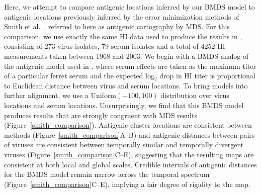 \documentclass[11pt,oneside,letterpaper]{article}
\begin{document}
Here, we attempt to compare antigenic locations inferred by our BMDS model to antigenic locations previously inferred by the error minimization methods of Smith et al.\ \cite{Smith04}, referred to here as antigenic cartography by MDS.
For this comparison, we use exactly the same HI data used to produce the results in \cite{Smith04}, consisting of 273 virus isolates, 79 serum isolates and a total of 4252 HI measurements taken between 1968 and 2003.
We begin with a BMDS analog of the antigenic model used in \cite{Smith04}, where serum effects are taken as the maximum titer of a particular ferret serum and the expected log$_2$ drop in HI titer is proportional to Euclidean distance between virus and serum locations.
To bring models into further alignment, we use a Uniform$(-100,100)$ distribution over virus locations and serum locations.
Unsurprisingly, we find that this BMDS model produces results that are strongly congruent with MDS results (Figure~\ref{smith_comparison}).
Antigenic cluster locations are consistent between methods (Figure~\ref{smith_comparison}A--B) and antigenic distances between pairs of viruses are consistent between temporally similar and temporally divergent viruses (Figure~\ref{smith_comparison}C--E), suggesting that the resulting maps are consistent at both local and global scales.
Credible intervals of antigenic distances for the BMDS model remain narrow across the temporal spectrum (Figure~\ref{smith_comparison}C--E), implying a fair degree of rigidity to the map.
\end{document}
